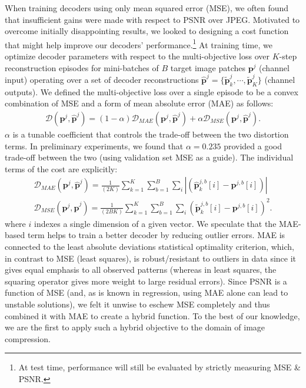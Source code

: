 \documentclass[smallabstract,smallcaptions]{dccpaper}
\begin{document}
When training decoders using only mean squared error (MSE), we often found that insufficient gains were made with respect to PSNR over JPEG. Motivated to overcome initially disappointing results, we looked to designing a cost function that might help improve our decoders' performance.\footnote{At test time, performance will still be evaluated by strictly measuring MSE \& PSNR.} At training time, we optimize decoder parameters with respect to the multi-objective loss over $K$-step reconstruction episodes for mini-batches of $B$ target image patches $\mathbf{p}^j$ (channel input) operating over a set of decoder reconstructions $\widehat{\mathbf{p}}^j = \{ \widetilde{\mathbf{p}}^j_k, \cdots, \widetilde{\mathbf{p}}^j_K \}$ (channel outputs). We defined the multi-objective loss over a single episode to be a convex combination of MSE and a form of mean absolute error (MAE) as follows:
\begin{align}
\mathcal{D}(\mathbf{p}^j,\widehat{\mathbf{p}}^j) = (1 - \alpha) \mathcal{D}_{MAE}(\mathbf{p}^j,\widehat{\mathbf{p}}^j) + \alpha \mathcal{D}_{MSE}(\mathbf{p}^j,\widehat{\mathbf{p}}^j) \mbox{.} \label{cost_function}
\end{align}
$\alpha$ is a tunable coefficient that controls the trade-off between the two distortion terms. In preliminary experiments, we found that $\alpha = 0.235$ provided a good trade-off between the two (using validation set MSE as a guide).
The individual terms of the cost are explicitly:
\begin{align}
\mathcal{D}_{MAE}(\mathbf{p}^j,\widehat{\mathbf{p}}^j) = \frac{1}{(2 K)}  \sum^K_{k=1} \sum^B_{b=1} \sum_i | ( \widehat{\mathbf{p}}^{j,b}_k[i] - \mathbf{p}^{j,b}[i] ) | \label{eqn:mae} \\
\mathcal{D}_{MSE}(\mathbf{p}^j,\widehat{\mathbf{p}}^j) = \frac{1}{(2 B K)}  \sum^K_{k=1} \sum^B_{b=1} \sum_i ( \widetilde{\mathbf{p}}^{j,b}_k[i] - \mathbf{p}^{j,b}[i] )^2 \mbox{.} \label{eqn:mse}
\end{align}
where $i$ indexes a single dimension of a given vector.
We speculate that the MAE-based term helps to train a better decoder by reducing outlier errors. MAE is connected to the least absolute deviations statistical optimality criterion, which, in contrast to MSE (least squares), is robust/resistant to outliers in data since it gives equal emphasis to all observed patterns (whereas in least squares, the squaring operator gives more weight to large residual errors). Since PSNR is a function of MSE (and, as is known in regression, using MAE alone can lead to unstable solutions), we felt it unwise to eschew MSE completely and thus combined it with MAE to create a hybrid function.
To the best of our knowledge, we are the first to apply such a hybrid objective to the domain of image compression.
\end{document}
